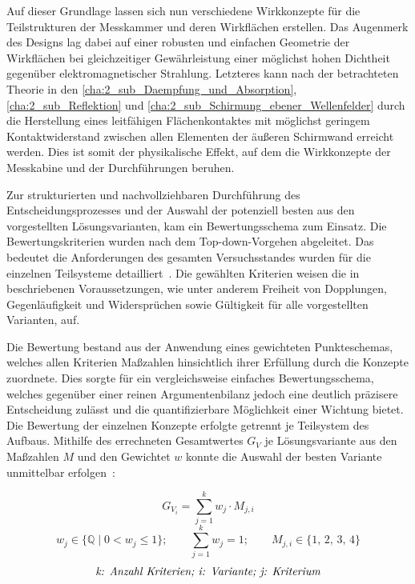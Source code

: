 Auf dieser Grundlage lassen sich nun verschiedene Wirkkonzepte für die Teilstrukturen der Messkammer und deren Wirkflächen erstellen. Das Augenmerk des Designs lag dabei auf einer robusten und einfachen Geometrie der Wirkflächen bei gleichzeitiger Gewährleistung einer möglichst hohen Dichtheit gegenüber elektromagnetischer Strahlung. Letzteres kann nach der betrachteten Theorie in den \mbox{\Abschnitten}\ref{cha:2_sub_Daempfung_und_Absorption}, \ref{cha:2_sub_Reflektion} und \ref{cha:2_sub_Schirmung_ebener_Wellenfelder} durch die Herstellung eines leitfähigen Flächenkontaktes mit möglichst geringem \mbox{Kontaktwiderstand} zwischen allen Elementen der äußeren Schirmwand erreicht werden. Dies ist somit der physikalische Effekt, auf dem die Wirkkonzepte der Messkabine und der Durchführungen beruhen. 
\par
\vspace{\linespace}
Zur strukturierten und nachvollziehbaren Durchführung des Entscheidungsprozesses und der Auswahl der potenziell besten aus den vorgestellten Lösungsvarianten, kam ein Bewertungsschema zum Einsatz. Die Bewertungskriterien wurden nach dem Top-down-Vorgehen abgeleitet. Das bedeutet die Anforderungen des gesamten Versuchsstandes wurden für die einzelnen Teilsysteme detailliert~\cite{Pahl_Beitz_Konstruktionslehre}. Die gewählten Kriterien weisen die in~\cite{Pahl_Beitz_Konstruktionslehre} beschriebenen Voraussetzungen, wie unter anderem Freiheit von Dopplungen, Gegenläufigkeit und Widersprüchen sowie Gültigkeit für alle vorgestellten Varianten, auf.
\par
\vspace{\linespace}
Die Bewertung bestand aus der Anwendung eines gewichteten Punkteschemas, welches allen Kriterien Maßzahlen hinsichtlich ihrer Erfüllung durch die Konzepte zuordnete. Dies sorgte für ein vergleichsweise einfaches Bewertungsschema, welches gegenüber einer reinen Argumentenbilanz jedoch eine deutlich präzisere Entscheidung zulässt und die quantifizierbare Möglichkeit einer Wichtung bietet. Die \mbox{Bewertung} der einzelnen Konzepte erfolgte getrennt je Teilsystem des Aufbaus. Mithilfe des errechneten Gesamtwertes $G_V$ je Lösungsvariante aus den Maßzahlen $M$ und den Gewichtet $w$ konnte die Auswahl der besten Variante unmittelbar erfolgen~\cite{Pahl_Beitz_Konstruktionslehre}:

\begin{equation}
    G_{V_i} = \sum_{j=1}^{k} w_j \cdot M_{j,i}
    \label{eq:3_Gesamtwert_Variantenvergleich}
\end{equation}
\begin{equation}
    w_j \in \{\mathbb{Q} \;\vert\; 0 < w_j \leq 1\}; \qquad \sum_{j=1}^{k} w_j = 1; \qquad M_{j,i} \in \{1,\,2,\,3,\,4\}
    \label{eq:3_Wichtung_Bewertung}
\end{equation}
\begin{equation*}
    \text{\textit{k: Anzahl Kriterien; i: Variante; j: Kriterium}}
\end{equation*}


